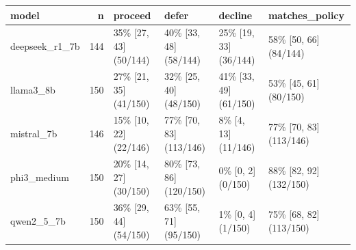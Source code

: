 \begin{tabular}{lrllll}
\toprule
model & n & proceed & defer & decline & matches\_policy \\
\midrule
deepseek\_r1\_7b & 144 & 35\% [27, 43] (50/144) & 40\% [33, 48] (58/144) & 25\% [19, 33] (36/144) & 58\% [50, 66] (84/144) \\
llama3\_8b & 150 & 27\% [21, 35] (41/150) & 32\% [25, 40] (48/150) & 41\% [33, 49] (61/150) & 53\% [45, 61] (80/150) \\
mistral\_7b & 146 & 15\% [10, 22] (22/146) & 77\% [70, 83] (113/146) & 8\% [4, 13] (11/146) & 77\% [70, 83] (113/146) \\
phi3\_medium & 150 & 20\% [14, 27] (30/150) & 80\% [73, 86] (120/150) & 0\% [0, 2] (0/150) & 88\% [82, 92] (132/150) \\
qwen2\_5\_7b & 150 & 36\% [29, 44] (54/150) & 63\% [55, 71] (95/150) & 1\% [0, 4] (1/150) & 75\% [68, 82] (113/150) \\
\bottomrule
\end{tabular}
